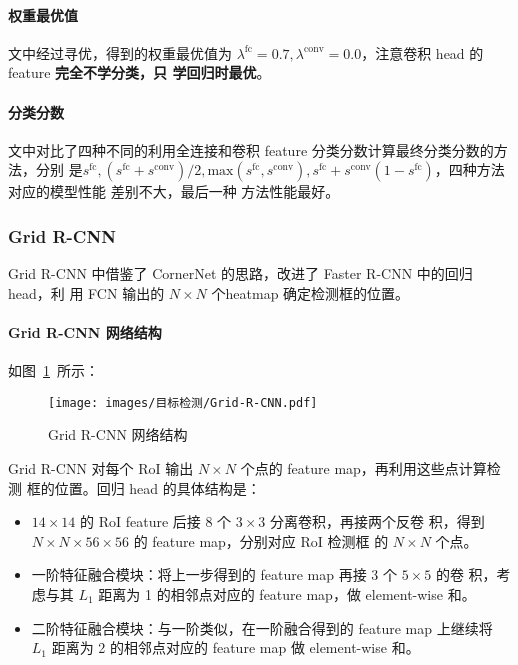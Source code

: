 \paragraph{权重最优值}
文中经过寻优，得到的权重最优值为 $\lambda^{\mathrm{fc}} = 0.7,
\lambda^{\mathrm{\mathrm{conv}}} = 0.0$，注意卷积 head 的 feature \textbf{完全不学分类，只
学回归时最优}。

\paragraph{分类分数}
文中对比了四种不同的利用全连接和卷积 feature 分类分数计算最终分类分数的方法，分别
是$s^{\mathrm{fc}}, (s^{\mathrm{fc}} + s^{\mathrm{conv}})/2,
\mathrm{max}(s^{\mathrm{fc}}, s^{\mathrm{conv}}), s^{\mathrm{fc}} +
s^{\mathrm{conv}}(1-s^{\mathrm{fc}})$，四种方法对应的模型性能 差别不大，最后一种
方法性能最好。

\subsubsection{Grid R-CNN}
Grid R-CNN 中借鉴了 CornerNet 的思路，改进了 Faster R-CNN 中的回归 head，利
用 FCN 输出的 $N \times N$ 个heatmap 确定检测框的位置。

\paragraph{Grid R-CNN 网络结构}
如图~\ref{fig:Grid-RCNN}~所示：

\begin{figure}[ht]
  \centering
  \texttt{[image: images/目标检测/Grid-R-CNN.pdf]}
  \caption{Grid R-CNN 网络结构}
  \label{fig:Grid-RCNN}
\end{figure}

Grid R-CNN 对每个 RoI 输出 $N \times N$ 个点的 feature map，再利用这些点计算检测
框的位置。回归 head 的具体结构是：

\begin{itemize}
  \item $14 \times 14$ 的 RoI feature 后接 8 个 $3 \times 3$ 分离卷积，再接两个反卷
    积，得到 $N \times N \times 56 \times 56$ 的 feature map，分别对应 RoI 检测框
    的 $N \times N$ 个点。
  \item 一阶特征融合模块：将上一步得到的 feature map 再接 3 个 $5 \times 5$ 的卷
    积，考虑与其 $L_1$ 距离为 1 的相邻点对应的 feature map，做 element-wise 和。
  \item 二阶特征融合模块：与一阶类似，在一阶融合得到的 feature map 上继续将
    $L_1$ 距离为 2 的相邻点对应的 feature map 做 element-wise 和。
\end{itemize}

